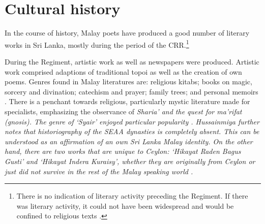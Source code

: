 % 
% 





\section{Cultural history}\label{sec:slmbg:CulturalHistory}
In the course of history, Malay poets have produced a good number of literary works in Sri Lanka, mostly during the period of the CRR.\footnote{There is no indication of literary activity preceding the Regiment. If there was literary activity, it could not have been widespread and would be confined to religious texts \citep[143]{Hussainmiya1990}.}




During the Regiment, artistic work as well as newspapers were
produced. Artistic work comprised adaptions of traditional topoi
as well as the creation of own poems. Genres found in Malay literatures are: religious kitabs; books on
magic, sorcery and divination; catechism and prayer; family trees;
and personal memoirs \citep[135]{Hussainmiya1990}. There is a
penchant towards religious, particularly mystic literature made
for specialists, emphasizing the observance of \em Sharia' \em and the quest for \em ma'rifat \em (gnosis).
The genre of `Syair' enjoyed particular
popularity \citep[139f]{Hussainmiya1990}. Hussainmiya further notes
that  historiography of the SEAA dynasties is completely absent. This can
be understood as an affirmation of an own Sri Lanka Malay identity. On the other
hand, there are two works that are unique to Ceylon: `Hikayat Raden
Bagus Gusti' and `Hikayat Indera Kuraisy', whether they are
originally from Ceylon or just did not survive in the rest of the
Malay speaking world \citep[135f]{Hussainmiya1990}.

